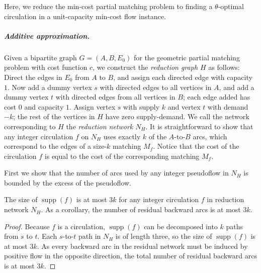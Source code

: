 \documentclass[a4paper,UKenglish]{socg-lipics-v2018}
\makeatletter
\def\eps{\varepsilon}
\def\set#1{\{ #1 \}}
\def\supp{\operatorname{supp}}
\theoremstyle{plain}
\numberwithin{figure}{section}
\renewcommand{\paragraph}{\subparagraph}
\def\EMPH#1{\textcolor{BrickRed}{{\emph{#1}}}}
\def\n@te#1{\textsf{\boldmath \textbf{$\langle\!\langle$#1$\rangle\!\rangle$}}\leavevmode}
\def\note#1{\textcolor{red}{\n@te{#1}}}
\makeatother
\begin{document}
Here, we reduce the min-cost partial matching problem to finding
a $\theta$-optimal circulation in a unit-capacity min-cost flow instance.

\paragraph{Additive approximation.}
Given a bipartite graph $G = (A,B,E_0)$ for the geometric partial matching problem with cost function $c$, we construct the \EMPH{reduction graph $H$} as follows:
Direct the edges in $E_0$ from $A$ to $B$, and assign each directed edge with capacity $1$.  Now add a dummy vertex $s$ with directed edges to all vertices in $A$, and add a dummy vertex $t$ with directed edges from all vertices in $B$; each edge added has cost $0$ and capacity $1$.
Assign vertex $s$ with supply $k$ and vertex $t$ with demand $-k$; the rest of the vertices in $H$ have zero supply-demand.
We call the network corresponding to $H$ the \EMPH{reduction network $N_H$}.
%
It is straightforward to show that any integer circulation $f$ on $N_H$ uses exactly
$k$ of the $A$-to-$B$ arcs, which correspond to the edges of a size-$k$
matching \EMPH{$M_f$}.
Notice that the cost of the circulation $f$ is equal to the cost of the corresponding matching $M_f$.
%

First we show that the number of arcs used by any integer pseudoflow in $N_H$ is bounded by the excess of the pseudoflow.

\begin{lemmarep}
\label{lemma:support_size}
The size of $\supp(f)$ is at most $3k$ for any integer circulation $f$ in reduction network $N_H$.
As a corollary, the number of residual backward arcs is at most $3k$.
\end{lemmarep}

\begin{proof}
Because $f$ is a circulation, $\supp(f)$ can be decomposed into $k$  paths from $s$ to $t$.
Each $s$-to-$t$ path in $N_H$ is of length three, so the size of $\supp(f)$ is at most $3k$.
As every backward arc in the residual network must be induced by positive flow in the opposite direction,
the total number of residual backward arcs is at most $3k$.
\end{proof}
\end{document}
